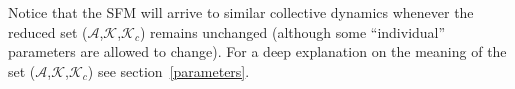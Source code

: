 \documentclass[preprint,12pt]{elsarticle}
\begin{document}
Notice that the SFM will arrive to similar collective dynamics whenever the 
reduced set ($\mathcal{A}$,$\mathcal{K}$,$\mathcal{K}_c$) remains unchanged 
(although some ``individual'' parameters are allowed to change). For a deep 
explanation on the meaning  of the set 
($\mathcal{A}$,$\mathcal{K}$,$\mathcal{K}_c$) see section~\ref{parameters}. \\








\end{document}
